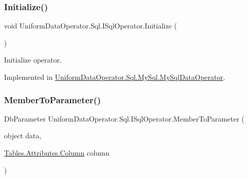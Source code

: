 \mbox{\label{interface_uniform_data_operator_1_1_sql_1_1_i_sql_operator_a590fa080f8c35ebf5ee6ac535545e2a8}} 
\subsubsection{\texorpdfstring{Initialize()}{Initialize()}}
{\footnotesize\ttfamily void Uniform\+Data\+Operator.\+Sql.\+I\+Sql\+Operator.\+Initialize (\begin{DoxyParamCaption}{ }\end{DoxyParamCaption})}



Initialize operator. 



Implemented in \mbox{\hyperlink{class_uniform_data_operator_1_1_sql_1_1_my_sql_1_1_my_sql_data_operator_a5aad834d2ceba598037b6ed19b27db6d}{Uniform\+Data\+Operator.\+Sql.\+My\+Sql.\+My\+Sql\+Data\+Operator}}.

\mbox{\label{interface_uniform_data_operator_1_1_sql_1_1_i_sql_operator_ab43375e7f5d9dcce2adfef2f19a2078f}} 
\subsubsection{\texorpdfstring{Member\+To\+Parameter()}{MemberToParameter()}}
{\footnotesize\ttfamily Db\+Parameter Uniform\+Data\+Operator.\+Sql.\+I\+Sql\+Operator.\+Member\+To\+Parameter (\begin{DoxyParamCaption}\item[{object}]{data,  }\item[{\mbox{\hyperlink{class_uniform_data_operator_1_1_sql_1_1_tables_1_1_attributes_1_1_column}{Tables.\+Attributes.\+Column}}}]{column }\end{DoxyParamCaption})}



